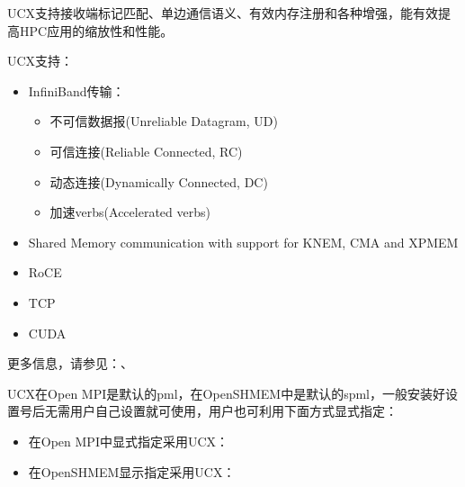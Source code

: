 \documentclass[a4paper,12pt,english]{sphinxmanual}
\begin{document}
\sphinxAtStartPar
UCX支持接收端标记匹配、单边通信语义、有效内存注册和各种增强，能有效提高HPC应用的缩放性和性能。

\sphinxAtStartPar
UCX支持：
\begin{itemize}
\item {} 
\sphinxAtStartPar
InfiniBand传输：
\begin{itemize}
\item {} 
\sphinxAtStartPar
不可信数据报(Unreliable Datagram, UD)

\item {} 
\sphinxAtStartPar
可信连接(Reliable Connected, RC)

\item {} 
\sphinxAtStartPar
动态连接(Dynamically Connected, DC)

\item {} 
\sphinxAtStartPar
加速verbs(Accelerated verbs)

\end{itemize}

\item {} 
\sphinxAtStartPar
Shared Memory communication with support for KNEM, CMA and XPMEM

\item {} 
\sphinxAtStartPar
RoCE

\item {} 
\sphinxAtStartPar
TCP

\item {} 
\sphinxAtStartPar
CUDA

\end{itemize}

\sphinxAtStartPar
更多信息，请参见：、

\sphinxAtStartPar
{}

\sphinxAtStartPar
UCX在Open MPI是默认的pml，在OpenSHMEM中是默认的spml，一般安装好设置号后无需用户自己设置就可使用，用户也可利用下面方式显式指定：
\begin{itemize}
\item {} 
\sphinxAtStartPar
在Open MPI中显式指定采用UCX：

\sphinxAtStartPar
{}

\item {} 
\sphinxAtStartPar
在OpenSHMEM显示指定采用UCX：

\sphinxAtStartPar
{}

\end{itemize}
\end{document}

